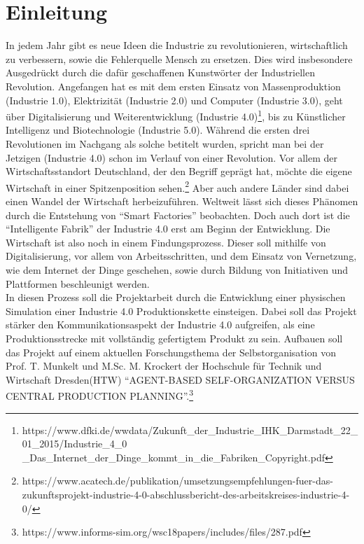 \chapter{Einleitung}


In jedem Jahr gibt es neue Ideen die Industrie zu revolutionieren, wirtschaftlich zu verbessern, sowie die Fehlerquelle Mensch zu ersetzen. Dies wird insbesondere Ausgedrückt durch die dafür geschaffenen Kunstwörter der Industriellen Revolution. Angefangen hat es mit dem ersten Einsatz von Massenproduktion (Industrie 1.0), Elektrizität (Industrie 2.0) und Computer (Industrie 3.0), geht über Digitalisierung und Weiterentwicklung (Industrie 4.0)\footnote{https://www.dfki.de/wwdata/Zukunft\_der\_Industrie\_IHK\_Darmstadt\_22\_01\_2015/Industrie\_4\_0\\\_Das\_Internet\_der\_Dinge\_kommt\_in\_die\_Fabriken\_Copyright.pdf}, bis zu Künstlicher Intelligenz und Biotechnologie (Industrie 5.0). Während die ersten drei Revolutionen im Nachgang als solche betitelt wurden, spricht man bei der Jetzigen (Industrie 4.0) schon im Verlauf von einer Revolution. Vor allem der Wirtschaftsstandort Deutschland, der den Begriff geprägt hat, möchte die eigene Wirtschaft in einer Spitzenposition sehen.\footnote{https://www.acatech.de/publikation/umsetzungsempfehlungen-fuer-das-zukunftsprojekt-industrie-4-0-abschlussbericht-des-arbeitskreises-industrie-4-0/} Aber auch andere Länder sind dabei einen Wandel der Wirtschaft herbeizuführen. Weltweit lässt sich dieses Phänomen durch die Entstehung von \enquote{Smart Factories} beobachten. Doch auch dort ist die \enquote{Intelligente Fabrik} der Industrie 4.0 erst am Beginn der Entwicklung. Die Wirtschaft ist also noch in einem Findungsprozess. Dieser soll mithilfe von Digitalisierung, vor allem von Arbeitsschritten, und dem Einsatz von Vernetzung, wie dem Internet der Dinge geschehen, sowie durch Bildung von Initiativen und Plattformen beschleunigt werden.\\
In diesen Prozess soll die Projektarbeit durch die Entwicklung einer physischen Simulation einer Industrie 4.0 Produktionskette einsteigen. Dabei soll das Projekt stärker den Kommunikationsaspekt der Industrie 4.0 aufgreifen, als eine Produktionsstrecke mit vollständig gefertigtem Produkt zu sein. Aufbauen soll das Projekt auf einem aktuellen Forschungsthema der Selbstorganisation von Prof. T. Munkelt und M.Sc. M. Krockert der Hochschule für Technik und Wirtschaft Dresden(HTW) \enquote{AGENT-BASED SELF-ORGANIZATION VERSUS CENTRAL PRODUCTION PLANNING}.\footnote{https://www.informs-sim.org/wsc18papers/includes/files/287.pdf}\\
